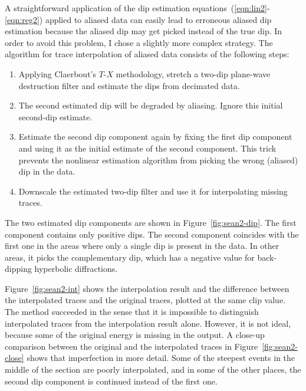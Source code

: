\par
A straightforward application of the dip estimation
equations~(\ref{eqn:lin2}-\ref{eqn:reg2}) applied to aliased data can
easily lead to erroneous aliased dip estimation because the aliased dip
may get picked instead of the true dip. In order to avoid
this problem, I chose a slightly more complex strategy. The algorithm for trace
interpolation of aliased data consists of the following steps:
\begin{enumerate}
\item Applying Claerbout's $T$-$X$ methodology, stretch a two-dip
  plane-wave destruction filter and estimate the dips from decimated
  data. 
\item The second estimated dip will be degraded by aliasing. Ignore
  this initial second-dip estimate.
\item Estimate the second dip component again by fixing the first dip
  component and using it as the initial estimate of the second
  component. This trick prevents the nonlinear estimation algorithm
  from picking the wrong (aliased) dip in the data.
\item Downscale the estimated two-dip filter and use it for
  interpolating missing traces.
\end{enumerate}
The two estimated dip components are shown in
Figure~\ref{fig:sean2-dip}. The first component contains only positive
dips. The second component coincides with the first one in the areas
where only a single dip is present in the data. In other areas, it
picks the complementary dip, which has a negative value for
back-dipping hyperbolic diffractions.

\par
Figure~\ref{fig:sean2-int} shows the interpolation result and the
difference between the interpolated traces and the original traces,
plotted at the same clip value. The method succeeded in the sense that
it is impossible to distinguish interpolated traces from the
interpolation result alone. However, it is not ideal, because some of
the original energy is missing in the output. A close-up comparison
between the original and the interpolated traces in
Figure~\ref{fig:sean2-close} shows that imperfection in more detail.
Some of the steepest events in the middle of the section are poorly
interpolated, and in some of the other places, the second dip
component is continued instead of the first one.

